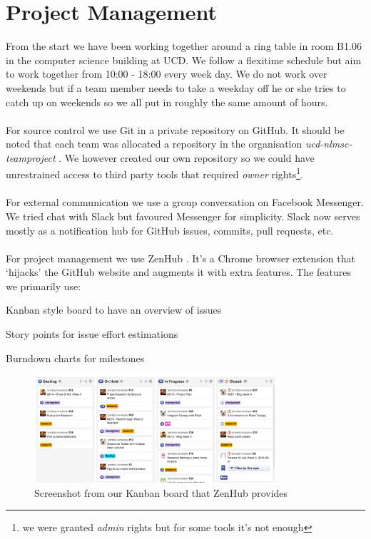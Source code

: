 \documentclass{article}
\begin{document}
\section{Project Management}
From the start we have been working together around a ring table in room B1.06 in the computer science building at UCD. We follow a flexitime schedule but aim to work together from 10:00 - 18:00 every week day. We do not work over weekends but if a team member needs to take a weekday off he or she tries to catch up on weekends so we all put in roughly the same amount of hours.
\\\\
For source control we use Git in a private repository on GitHub. It should be noted that each team was allocated a repository in the organisation \linebreak \mbox{\textit{ucd-nlmsc-teamproject}} \cite{ucdgithub}. We however created our own repository \cite{gitrepo} so we could have unrestrained access to third party tools that required \textit{owner} rights\footnote{we were granted \textit{admin} rights but for some tools it's not enough}.
\\\\
For external communication we use a group conversation on Facebook Messenger. We tried chat with Slack  but favoured Messenger for simplicity. Slack now serves mostly as a notification hub for GitHub issues, commits, pull requests, etc.
\\\\
For project management we use ZenHub \cite{zenhub}. It's a Chrome browser extension that `hijacks' the GitHub website and augments it with extra features. The features we primarily use:

\begin{samepage}
\begin{itemize*}
	\item Kanban style board to have an overview of issues
	\item Story points for issue effort estimations
	\item Burndown charts for milestones
\end{itemize*}
\end{samepage}


\begin{figure}[H]
    \centering
    \includegraphics[width=0.8\textwidth]{kanbanboard}  
    \caption{Screenshot from our Kanban board that ZenHub provides}
\end{figure}
\end{document}
